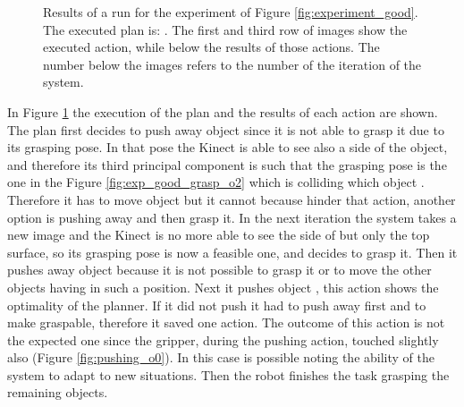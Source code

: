 \begin{figure}
\caption{Results of a run for the experiment of Figure \ref{fig:experiment_good}. The executed plan is:  
. The first and third row of images show the executed action, while below the results of those actions. The number below the images refers to the number of the iteration of the system.}\label{fig:execution_experiment}
\end{figure}

In Figure \ref{fig:execution_experiment} the execution of the plan and the results of each action are shown. The plan first decides to push away object  since it is not able to grasp it due to its grasping pose. In that pose the Kinect is able to see also a side of the object, and therefore its third principal component is such that the grasping pose is the one in the Figure \ref{fig:exp_good_grasp_o2} which is colliding which object . Therefore it has to move object  but it cannot because  hinder that action, another option is pushing away  and then grasp it. In the next iteration the system takes a new image and the Kinect is no more able to see the side of  but only the top surface, so its grasping pose is now a feasible one, and decides to grasp it. Then it pushes away object  because it is not possible to grasp it or to move the other objects having  in such a position. Next it pushes object , this action shows the optimality of the planner. If it did not push  it had to push away first  and  to make  graspable, therefore it saved one action. The outcome of this action is not the expected one since the gripper, during the pushing action, touched slightly also  (Figure \ref{fig:pushing_o0}). In this case is possible noting the ability of the system to adapt to new situations. Then the robot finishes the task grasping the remaining objects.



